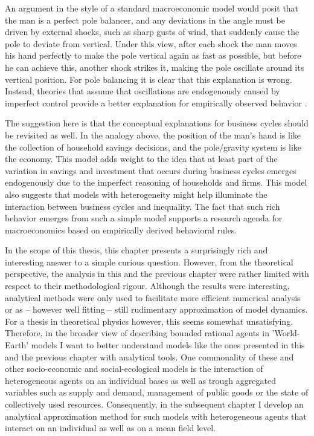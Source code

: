 An argument in the style of a standard macroeconomic model would posit that the man is a perfect pole balancer, and any deviations in the angle must be driven by external shocks, such as sharp gusts of wind, that suddenly cause the pole to deviate from vertical.  Under this view, after each shock the man moves his hand perfectly to make the pole vertical again as fast as possible, but before he can achieve this, another shock strikes it, making the pole oscillate around its vertical position.  For pole balancing it is clear that this explanation is wrong. Instead, theories that assume that oscillations are endogenously caused by imperfect control provide a better explanation for empirically observed behavior \citep{insperger2017stick}.

The suggestion here is that the conceptual explanations for business cycles should be revisited as well. In the analogy above, the position of the man's hand is like the collection of household savings decisions, and the pole/gravity system is like the economy.  This model adds weight to the idea that at least part of the variation in savings and investment that occurs during business cycles emerges endogenously due to the imperfect reasoning of households and firms.  This model also suggests that models with heterogeneity might help illuminate the interaction between business cycles and inequality.  The fact that such rich behavior emerges from such a simple model supports a research agenda for macroeconomics based on empirically derived behavioral rules.

In the scope of this thesis, this chapter presents a surprisingly rich and interesting answer to a simple curious question. However, from the theoretical perspective, the analysis in this and the previous chapter were rather limited with respect to their methodological rigour. Although the results were interesting, analytical methods were only used to facilitate more efficient numerical analysis or as -- however well fitting -- still rudimentary approximation of model dynamics. For a thesis in theoretical physics however, this seems somewhat unsatisfying. Therefore, in the broader view of describing bounded rational agents in 'World-Earth' models I want to better understand models like the ones presented in this and the previous chapter with analytical tools. One commonality of these and other socio-economic and social-ecological models is the interaction of heterogeneous agents on an individual bases as well as trough aggregated variables such as supply and demand, management of public goods or the state of collectively used resources. Consequently, in the subsequent chapter I develop an analytical approximation method for such models with heterogeneous agents that interact on an individual as well as on a mean field level.
